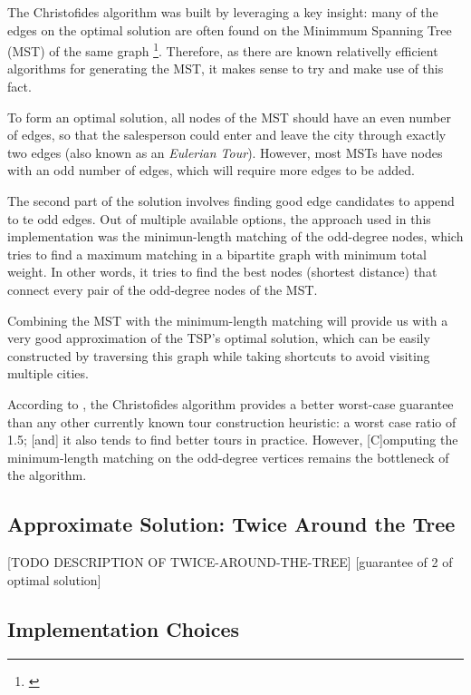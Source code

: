 \documentclass[12pt]{article}
\begin{document}
The Christofides algorithm was built by leveraging a key insight: many of the edges on the 
optimal solution are often found on the Minimmum Spanning Tree (MST) of the same graph 
\footnote{\cite{reducible_explanation}}. Therefore, as there are known relativelly efficient 
algorithms for generating the MST, it makes sense to try and make use of this fact.

To form an optimal solution, all nodes of the MST should have an even number of edges, so 
that the salesperson could enter and leave the city through exactly two edges (also known as an 
\textit{Eulerian Tour}). However, most MSTs have nodes with an odd number of edges, 
which will require more edges to be added.

The second part of the solution involves finding good edge candidates to append to te odd 
edges. Out of multiple available options, the approach used in this implementation was the minimun-length
matching of the odd-degree nodes, which tries to find a maximum matching in a bipartite 
graph with minimum total weight. In other words, it tries to find the best nodes (shortest distance) 
that connect every pair of the odd-degree nodes of the MST.

Combining the MST with the minimum-length matching will provide us with a very good 
approximation of the TSP's optimal solution, which can be easily constructed by
traversing this graph while taking shortcuts to avoid visiting multiple cities.

According to \cite{Johnson2003}, the Christofides algorithm provides a better 
worst-case guarantee than any other currently known tour construction heuristic: a worst case ratio of 1.5; 
[and] it also tends to find better tours in practice. However, [C]omputing the minimum-length 
matching on the odd-degree vertices remains the bottleneck of the algorithm.

\subsection{Approximate Solution: Twice Around the Tree} \label{sec:twice_explanation}

[TODO DESCRIPTION OF TWICE-AROUND-THE-TREE]
[guarantee of 2 of optimal solution]

\subsection{Implementation Choices} \label{sec:implementation}
\end{document}
